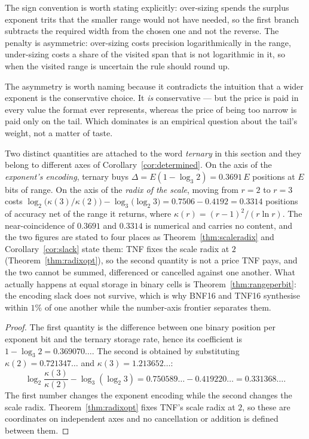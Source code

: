 The sign convention is worth stating explicitly: over-sizing spends the surplus
exponent trits that the smaller range would not have needed, so the first branch
subtracts the required width from the chosen one and not the reverse. The penalty
is asymmetric: over-sizing costs precision logarithmically in the range,
under-sizing costs a share of the visited span that is not logarithmic in it, so
when the visited range is uncertain the rule should round up.

The asymmetry is worth naming because it contradicts the intuition that a wider
exponent is the conservative choice. It \emph{is} conservative --- but the price is
paid in every value the format ever represents, whereas the price of being too
narrow is paid only on the tail. Which dominates is an empirical question about
the tail's weight, not a matter of taste.

\begin{corollary}
\label{cor:worth}
Two distinct quantities are attached to the word \emph{ternary} in this section and
they belong to different axes of Corollary~\ref{cor:determined}. On the axis of the
\emph{exponent's encoding}, ternary buys $\Delta = E(1-\log_3 2) = 0.3691\,E$
positions at $E$ bits of range. On the axis of the \emph{radix of the scale},
moving from $r{=}2$ to $r{=}3$ costs $\log_2\bigl(\kappa(3)/\kappa(2)\bigr) -
\log_3\bigl(\log_2 3\bigr) = 0.7506 - 0.4192 = 0.3314$ positions of accuracy net
of the range it returns, where
$\kappa(r) = (r-1)^2/(r \ln r)$. The near-coincidence of $0.3691$ and $0.3314$ is
numerical and carries no content, and the two figures are stated to four places as
Theorem~\ref{thm:scaleradix} and Corollary~\ref{cor:slack} state them: TNF fixes the scale radix at $2$
(Theorem~\ref{thm:radixopt}), so the second quantity is not a price TNF pays, and
the two cannot be summed, differenced or cancelled against one another. What
actually happens at equal storage in binary cells is
Theorem~\ref{thm:rangeperbit}: the encoding slack does not survive, which is why
BNF16 and TNF16 synthesise within $1\%$ of one another while the number-axis
frontier separates them.
\end{corollary}
\begin{proof}
The first quantity is the difference between one binary position per exponent
bit and the ternary storage rate, hence its coefficient is
$1-\log_3 2=0.369070\ldots$. The second is obtained by substituting
$\kappa(2)=0.721347\ldots$ and $\kappa(3)=1.213652\ldots$:
\[
\log_2\!\frac{\kappa(3)}{\kappa(2)}
-\log_3(\log_2 3)
=0.750589\ldots-0.419220\ldots
=0.331368\ldots.
\]
The first number changes the exponent encoding while the second changes the
scale radix. Theorem~\ref{thm:radixopt} fixes TNF's scale radix at $2$, so
these are coordinates on independent axes and no cancellation or addition is
defined between them.
\end{proof}

